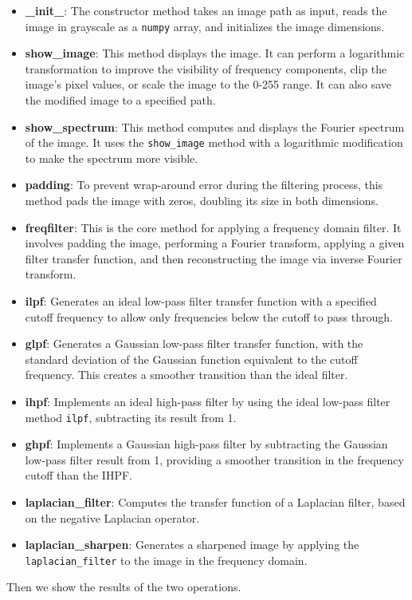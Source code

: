 \documentclass[UTF8]{ctexart}
\begin{document}
\begin{itemize}
    \item \textbf{\_init\_}: The constructor method takes an image path as input, reads the image in grayscale as a \texttt{numpy} array, and initializes the image dimensions.
    
    \item \textbf{show\_image}: This method displays the image. It can perform a logarithmic transformation to improve the visibility of frequency components, clip the image's pixel values, or scale the image to the 0-255 range. It can also save the modified image to a specified path.
    
    \item \textbf{show\_spectrum}: This method computes and displays the Fourier spectrum of the image. It uses the \texttt{show\_image} method with a logarithmic modification to make the spectrum more visible.
    
    \item \textbf{padding}: To prevent wrap-around error during the filtering process, this method pads the image with zeros, doubling its size in both dimensions.
    
    \item \textbf{freqfilter}: This is the core method for applying a frequency domain filter. It involves padding the image, performing a Fourier transform, applying a given filter transfer function, and then reconstructing the image via inverse Fourier transform.
    
    \item \textbf{ilpf}: Generates an ideal low-pass filter transfer function with a specified cutoff frequency to allow only frequencies below the cutoff to pass through.
    
    \item \textbf{glpf}: Generates a Gaussian low-pass filter transfer function, with the standard deviation of the Gaussian function equivalent to the cutoff frequency. This creates a smoother transition than the ideal filter.
    
    \item \textbf{ihpf}: Implements an ideal high-pass filter by using the ideal low-pass filter method \texttt{ilpf}, subtracting its result from 1.
    
    \item \textbf{ghpf}: Implements a Gaussian high-pass filter by subtracting the Gaussian low-pass filter result from 1, providing a smoother transition in the frequency cutoff than the IHPF.
    
    \item \textbf{laplacian\_filter}: Computes the transfer function of a Laplacian filter, based on the negative Laplacian operator.
    
    \item \textbf{laplacian\_sharpen}: Generates a sharpened image by applying the \texttt{laplacian\_filter} to the image in the frequency domain.
\end{itemize}
Then we show the results of the two operations.
\end{document}
